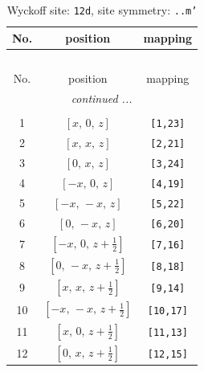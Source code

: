 \documentclass[fleqn,8pt]{jsarticle}
\begin{document}
\begin{longtable}{ccc}
\caption{Wyckoff site: {\tt 12d}, site symmetry: {\tt ..m'}}
 \\
 \hline \hline
No. & position & mapping \\ \hline \endfirsthead

\multicolumn{2}{l}{\tablename\ \thetable{}} \\
 \hline \hline
No. & position & mapping \\ \hline \endhead

 \hline \hline
\multicolumn{2}{r}{\footnotesize\it continued ...} \\ \endfoot

 \hline \hline
\multicolumn{2}{r}{} \\ \endlastfoot

1 & $\left[ x,\, 0,\, z \right]$ & {\tt [1,23]} \\ \hline
2 & $\left[ x,\, x,\, z \right]$ & {\tt [2,21]} \\ \hline
3 & $\left[ 0,\, x,\, z \right]$ & {\tt [3,24]} \\ \hline
4 & $\left[ - x,\, 0,\, z \right]$ & {\tt [4,19]} \\ \hline
5 & $\left[ - x,\, - x,\, z \right]$ & {\tt [5,22]} \\ \hline
6 & $\left[ 0,\, - x,\, z \right]$ & {\tt [6,20]} \\ \hline
7 & $\left[ - x,\, 0,\, z + \frac{1}{2} \right]$ & {\tt [7,16]} \\ \hline
8 & $\left[ 0,\, - x,\, z + \frac{1}{2} \right]$ & {\tt [8,18]} \\ \hline
9 & $\left[ x,\, x,\, z + \frac{1}{2} \right]$ & {\tt [9,14]} \\ \hline
10 & $\left[ - x,\, - x,\, z + \frac{1}{2} \right]$ & {\tt [10,17]} \\ \hline
11 & $\left[ x,\, 0,\, z + \frac{1}{2} \right]$ & {\tt [11,13]} \\ \hline
12 & $\left[ 0,\, x,\, z + \frac{1}{2} \right]$ & {\tt [12,15]} \\
\end{longtable}
\renewcommand{\arraystretch}{1.2}
\end{document}

